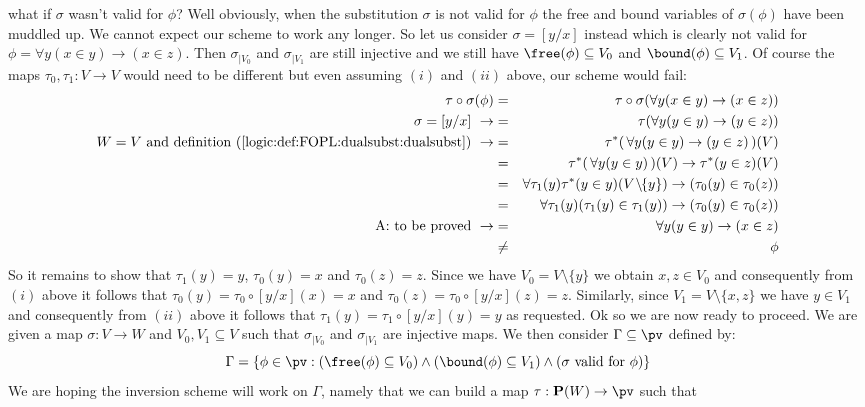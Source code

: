 what if $\sigma$ wasn't valid for $\phi$? Well obviously, when the
substitution $\sigma$ is not valid for $\phi$ the free and bound
variables of $\sigma(\phi)$ have been muddled up. We cannot expect
our scheme to work any longer. So let us consider $\sigma=[y/x]$
instead which is clearly not valid for $\phi=\forall y(x\in
y)\to(x\in z)$. Then $\sigma_{|V_{0}}$ and $\sigma_{|V_{1}}$ are
still injective and we still have $\free(\phi)\subseteq V_{0}$ and
$\bound(\phi)\subseteq V_{1}$. Of course the maps
$\tau_{0},\tau_{1}:V\to V$ would need to be different but even
assuming $(i)$ and $(ii)$ above, our scheme would fail:
    \begin{eqnarray*}
    \tau\circ\sigma(\phi)&=&\tau\circ\sigma(\forall y(x\in y)\to(x\in
    z))\\
    \sigma=[y/x]\ \rightarrow&=&\tau(\forall y(y\in y)\to(y\in z))\\
    \mbox{$W=V$ and definition~(\ref{logic:def:FOPL:dualsubst:dualsubst})}\
    \rightarrow
    &=&\tau^{*}(\,\forall y(y\in y)\to(y\in z)\,)(V)\\
    &=&\tau^{*}(\,\forall y(y\in y)\,)(V)\to\tau^{*}(y\in z)(V)\\
    &=&\forall \tau_{1}(y)\tau^{*}(y\in
    y)(V\!\setminus\!\!\{y\})\to(\tau_{0}(y)\in\tau_{0}(z))\\
    &=&\forall\tau_{1}(y)(\tau_{1}(y)\in
    \tau_{1}(y))\to(\tau_{0}(y)\in\tau_{0}(z))\\
    \mbox{A: to be proved}\ \rightarrow&=&\forall y(y\in y)\to(x\in z)\\
    &\neq&\phi
    \end{eqnarray*}
So it remains to show that $\tau_{1}(y)=y$, $\tau_{0}(y)=x$ and
$\tau_{0}(z)=z$. Since we have $V_{0}=V\setminus\{y\}$ we obtain
$x,z\in V_{0}$ and consequently from $(i)$ above it follows that
$\tau_{0}(y)=\tau_{0}\circ[y/x](x)=x$ and
$\tau_{0}(z)=\tau_{0}\circ[y/x](z)=z$. Similarly, since
$V_{1}=V\setminus\{x,z\}$ we have $y\in V_{1}$ and consequently from
$(ii)$ above it follows that $\tau_{1}(y)=\tau_{1}\circ[y/x](y)=y$
as requested. Ok so we are now ready to proceed. We are given a map
$\sigma:V\to W$ and $V_{0}, V_{1}\subseteq V$ such that
$\sigma_{|V_{0}}$ and $\sigma_{|V_{1}}$ are injective maps. We then
consider $\Gamma\subseteq\pv$ defined by:
    \[
    \Gamma=\{\phi\in\pv:(\free(\phi)\subseteq
    V_{0})\land(\bound(\phi)\subseteq V_{1})\land(\mbox{$\sigma$
    valid for $\phi$})\}
    \]
We are hoping the inversion scheme will work on $\Gamma$, namely
that we can build a map $\tau:{\bf P}(W)\to\pv$ such that

